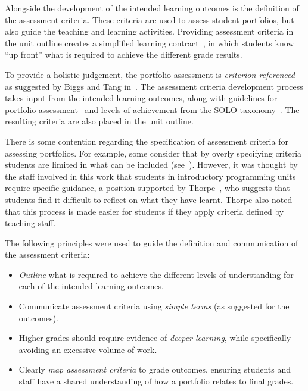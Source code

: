 Alongside the development of the intended learning outcomes is the definition of the assessment criteria. These criteria are used to assess student portfolios, but also guide the teaching and learning activities. Providing assessment criteria in the unit outline creates a simplified learning contract~\cite{Stephenson:1993}, in which students know ``up front'' what is required to achieve the different grade results.

To provide a holistic judgement, the portfolio assessment is \emph{criterion-referenced} as suggested by Biggs and Tang in~\cite{Biggs:1997}. The assessment criteria development process takes input from the intended learning outcomes, along with guidelines for portfolio assessment~\cite{Biggs:2007} and levels of achievement from the SOLO taxonomy~\cite{Biggs:1982}. The resulting criteria are also placed in the unit outline.

There is some contention regarding the specification of assessment criteria for assessing portfolios. For example, some consider that by overly specifying criteria students are limited in what can be included (see~\cite{Driessen:2005,Tigelaar:2007}). However, it was thought by the staff involved in this work that students in introductory programming units require specific guidance, a position supported by Thorpe~\cite{Thorpe:2000}, who suggests that students find it difficult to reflect on what they have learnt. Thorpe also noted that this process is made easier for students if they apply criteria defined by teaching staff. 

The following principles were used to guide the definition and communication of the assessment criteria:

\begin{itemize}
  \item \emph{Outline} what is required to achieve the different levels of understanding for each of the intended learning outcomes.
  \item Communicate assessment criteria using \emph{simple terms} (as suggested for the outcomes).
  \item Higher grades should require evidence of \emph{deeper learning}, while specifically avoiding an excessive volume of work.
  \item Clearly \emph{map assessment criteria} to grade outcomes, ensuring students and staff have a shared understanding of how a portfolio relates to final grades.
\end{itemize}


